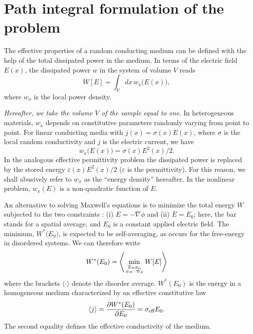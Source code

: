 \section{Path integral formulation of the problem}
\label{pifotp}
The effective properties of a random 
conducting medium can be defined with the help of the
total dissipated power in the medium\cite{WILL86,SANC87,PONT92b}. 
In terms of the electric field
$E(x)$, the dissipated power $w$ in the system of volume $V$ reads
\begin{equation}
W[E]=\int_V dx\,w_x\bigl(E(x)\bigr), 
\end{equation}
where $w_x$ is the local power density.

{\em Hereafter, we take the volume $V$ of the sample equal to one}. In
heterogeneous materials, $w_x$ depends on constitutive
parameters randomly varying from point to point. For linear conducting
media with $j(x)=\sigma(x)E(x)$, where $\sigma$ is the local random
conductivity and $j$ is the electric current, we have
\begin{equation}
\label{linmed}
w_x\bigl(E(x)\bigr)=\sigma(x)E^2(x)/2.
\end{equation}
In the analogous effective
permittivity problem the dissipated power is replaced by the stored
energy $\varepsilon(x)E^2(x)/2$ ($\varepsilon$ is the
permittivity). For this reason, we shall abusively refer to $w_x$ as
the ``energy density'' hereafter. In the nonlinear problem, $w_x(E)$
is a non-quadratic function of $E$.

An alternative to solving Maxwell's equations is to minimize the total
energy $W$ subjected to the two constraints \cite{WILL86,SANC87}: (i) $E=- \nabla\phi$ and 
(ii) $\overline{E}=E_0$; here, the bar stands for a spatial average, 
and $E_0$ is a constant applied electric field. The 
minimum, $W^*\bigl(E_0\bigr)$, is expected to be self-averaging, as
occurs for the free-energy in disordered systems. We can therefore write
\begin{equation}
\label{mini}
W^*(E_0)=\left\langle\mathop{\text{min}}_{\overline{E}
=E_0 \atop{E=-\nabla\phi}} W[E]\right\rangle
\end{equation}
where the brackets $\langle\cdot\rangle$ denote the disorder average. 
$W^*(E_0)$ is the energy in a homogeneous medium 
characterized by an effective
constitutive law \cite{WILL86}
\begin{equation}
\label{constef}
\left\langle j\right\rangle={\partial W^*(E_0)\over \partial
E_0}=\sigma_{\text{eff}} E_0.
\end{equation}
The second equality defines the effective conductivity of the medium.

